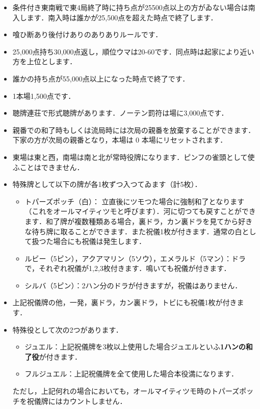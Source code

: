 \documentclass[uplatex]{jsarticle}
\begin{document}
\begin{itemize}
    \item 条件付き東南戦で東4局終了時に持ち点が25500点以上の方がゐない場合は南入します．南入時は誰かが25,500点を超えた時点で終了します．
    \item 喰ひ断あり後付けありのありありルールです．
    \item 25,000点持ち30,000点返し，順位ウマは20-60です．同点時は起家により近い方を上位とします．
    \item 誰かの持ち点が55,000点以上になった時点で終了です．
    \item 1本場1,500点です．
    \item 聴牌連荘で形式聴牌があります．ノーテン罰符は場に3,000点です．
    \item 親番での和了時もしくは流局時には次局の親番を放棄することができます．下家の方が次局の親番となり，本場は 0 本場にリセットされます．
    \item 東場は東と西，南場は南と北が常時役牌になります．ピンフの雀頭として使ふことはできません．
    \item 特殊牌として以下の牌が各1枚ずつ入つてゐます（計5枚）．
        \begin{itemize}
            \item トパーズポッチ（白）： 立直後にツモつた場合に強制和了となります（これをオールマイティツモと呼びます）．河に切つても戻すことができます．和了牌が複数種類ある場合，裏ドラ，カン裏ドラを見てから好きな待ち牌に取ることができます．また祝儀1枚が付きます．通常の白として扱つた場合にも祝儀は発生します．
            \item ルビー（5ピン），アクアマリン（5ソウ），エメラルド（5マン）：ドラで，それぞれ祝儀が1,2,3枚付きます．鳴いても祝儀が付きます．
            \item シルバ（5ピン）：2ハン分のドラが付きますが，祝儀はありません．
        \end{itemize}
    \item 上記祝儀牌の他，一発，裏ドラ，カン裏ドラ，トビにも祝儀1枚が付きます．
    \item 特殊役として次の2つがあります．
        \begin{itemize}
            \item ジュエル：上記祝儀牌を3枚以上使用した場合ジュエルといふ\textbf{1ハンの和了役}が付きます．
            \item フルジュエル：上記祝儀牌を全て使用した場合本役満になります．
        \end{itemize}
        ただし，上記何れの場合においても，オールマイティツモ時のトパーズポッチを祝儀牌にはカウントしません．

\end{itemize}
\end{document}
